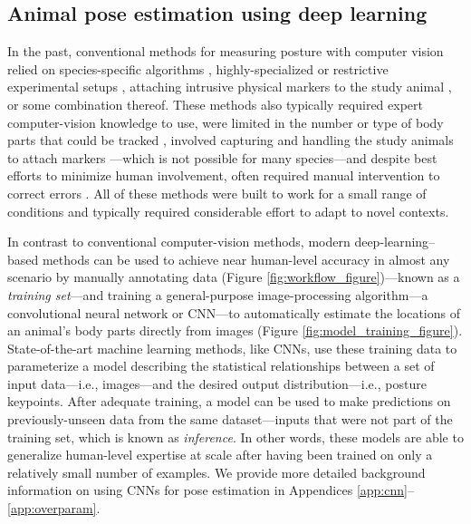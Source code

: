 \documentclass[11pt,a4paper,oneside]{book}
\begin{document}
\begin{doublespace}
\subsection{Animal pose estimation using deep learning}
In the past, conventional methods for measuring posture with computer vision relied on species-specific algorithms \citep{uhlmann2017flylimbtracker}, highly-specialized or restrictive experimental setups \citep{mendes2013quantification, kain2013leg}, attaching intrusive physical markers to the study animal \citep{kain2013leg}, or some combination thereof. These methods also typically required expert computer-vision knowledge to use, were limited in the number or type of body parts that could be tracked \citep{mendes2013quantification}, involved capturing and handling the study animals to attach markers \citep{kain2013leg}---which is not possible for many species---and despite best efforts to minimize human involvement, often required manual intervention to correct errors \citep{uhlmann2017flylimbtracker}. All of these methods were built to work for a small range of conditions and typically required considerable effort to adapt to novel contexts.

In contrast to conventional computer-vision methods, modern deep-learning–based methods can be used to achieve near human-level accuracy in almost any scenario by manually annotating data (Figure \ref{fig:workflow_figure})—known as a \textit{training set}—and training a general-purpose image-processing algorithm—a convolutional neural network or CNN—to automatically estimate the locations of an animal's body parts directly from images (Figure \ref{fig:model_training_figure}). State-of-the-art machine learning methods, like CNNs, use these training data to parameterize a model describing the statistical relationships between a set of input data—i.e., images—and the desired output distribution—i.e., posture keypoints. After adequate training, a model can be used to make predictions on previously-unseen data from the same dataset—inputs that were not part of the training set, which is known as \textit{inference}. In other words, these models are able to generalize human-level expertise at scale after having been trained on only a relatively small number of examples. We provide more detailed background information on using CNNs for pose estimation in Appendices \ref{app:cnn}–\ref{app:overparam}.


\end{doublespace}
\end{document}
